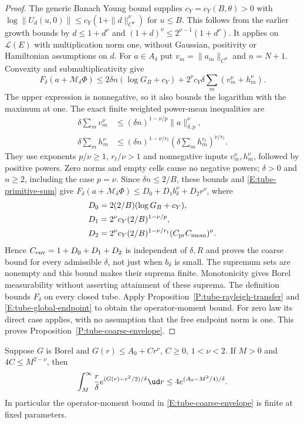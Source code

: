 \begin{proof}
  The generic Banach Young bound supplies $c_Y=c_Y(B,\theta)>0$
  with $\log\|U_d(u,0)\|\le c_Y(1+\|d\|_{C^\theta}^{\nu})$
  for $u\le B$. This follows from the earlier growth bounds by
  $d\le1+d^\nu$ and
  $(1+d)^\nu\le2^{\nu-1}(1+d^\nu)$.
  It applies on $\mathcal L(E)$ with multiplication norm one,
  without Gaussian, positivity or Hamiltonian assumptions on $d$.
  For $a\in A_\delta$ put $v_m=\|a_m\|_{C^\theta}$ and
  $n=N+1$. Convexity and submultiplicativity give
  \[
    F_\delta(a+\mathcal M_\delta\Phi)
    \le2\delta n(\log G_B+c_Y)
    +2^\nu c_Y\delta\sum_m(v_m^\nu+h_m^\nu).
  \]
  The upper expression is nonnegative, so it also bounds the
  logarithm with the maximum at one.
  The exact finite weighted power-mean inequalities are
  \begin{align*}
    \delta\sum_m v_m^\nu
    &\le(\delta n)^{1-\nu/p}\|a\|_{\delta,p}^\nu,\\
    \delta\sum_m h_m^\nu
    &\le(\delta n)^{1-\nu/r_t}
    \left(\delta\sum_m h_m^{r_t}\right)^{\nu/r_t}.
  \end{align*}
  They use exponents $p/\nu\ge1$, $r_t/\nu>1$ and
  nonnegative inputs $v_m^\nu,h_m^\nu$, followed by positive powers.
  Zero norms and empty cells cause no negative powers;
  $\delta>0$ and $n\ge2$, including the case $p=\nu$.
  Since $\delta n\le2/B$, these bounds and
  \eqref{E:tube-primitive-sum} give
  $F_\delta(a+\mathcal M_\delta\Phi)
  \le D_0+D_1b_\delta^\nu+D_2r^\nu$, where
  \begin{align*}
    D_0&=2(2/B)(\log G_B+c_Y),\\
    D_1&=2^\nu c_Y(2/B)^{1-\nu/p},\\
    D_2&=2^\nu c_Y(2/B)^{1-\nu/r_t}
    (C_{\rm pr}C_{\rm mean})^\nu .
  \end{align*}
  Hence $C_{\rm env}=1+D_0+D_1+D_2$ is independent of
  $\delta,R$ and proves the coarse bound for every admissible
  $\delta$, not just when $b_\delta$ is small.
  The supremum sets are nonempty and this bound makes their
  suprema finite. Monotonicity gives Borel measurability without
  asserting attainment of these suprema.
  The definition bounds $F_\delta$ on every closed tube.
  Apply Proposition~\ref{P:tube-rayleigh-transfer} and
  \eqref{E:tube-global-endpoint} to obtain the operator-moment bound.
  For zero law its direct case applies, with no assumption that
  the free endpoint norm is one.
  This proves Proposition~\ref{P:tube-coarse-envelope}.
\end{proof}

\begin{lemma}\label{L:tube-rayleigh-tail}
  Suppose $G$ is Borel and $G(r)\le A_0+Cr^\nu$, $C\ge0$, $1<\nu<2$.
  If $M>0$ and $4C\le M^{2-\nu}$, then
  \begin{equation}\label{E:tube-rayleigh-tail}
    \int_M^\infty\frac r\delta
    e^{(G(r)-r^2/2)/\delta}\ud r
    \le4e^{(A_0-M^2/4)/\delta}.
  \end{equation}
  In particular the operator-moment bound in
  \eqref{E:tube-coarse-envelope} is finite at fixed parameters.
\end{lemma}

